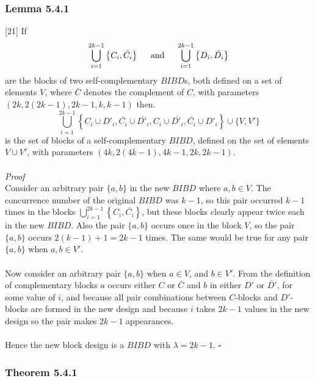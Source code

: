 \documentclass[
  12pt,
  a4paper]{book}
\begin{document}
\hypertarget{lemma-5.4.1}{%
\subsubsection{Lemma 5.4.1}\label{lemma-5.4.1}}

{[}21{]} If
\[\bigcup\limits_{i=1}^{2k-1} \left \{C_i,\bar{C_i} \right \} \hspace{0.5cm} \mathrm{and} \hspace{0.5cm} 
\bigcup\limits_{i=1}^{2k-1} \left \{D_i,\bar{D_i} \right \}\] are the
blocks of two self-complementary \(BIBD\)s, both defined on a set of
elements \(V\), where \(\bar{C}\) denotes the complement of \(C\), with
parameters \((2k,2(2k-1),2k-1,k,k-1)\) then.
\[\bigcup\limits_{i=1}^{2k-1} \left \{C_i \cup D'_i, \bar{C_i} \cup \bar{D'_i}, C_i \cup \bar{D'_i},
\bar{C_i} \cup D'_i  \right \} \cup \{V,V'\}\] is the set of blocks of a
self-complementary \(BIBD\), defined on the set of elements
\(V \cup V'\), with parameters \((4k,2(4k-1),4k-1,2k,2k-1)\).\\
~\\
\emph{Proof}\\
Consider an arbitrary pair \(\{a,b\}\) in the new \(BIBD\) where
\(a,b \in V\). The concurrence number of the original \(BIBD\) was
\(k-1\), so this pair occurred \(k-1\) times in the blocks
\(\bigcup\limits_{i=1}^{2k-1} \left \{C_i,\bar{C_i} \right \}\), but
these blocks clearly appear twice each in the new \(BIBD\). Also the
pair \(\{a,b\}\) occurs once in the block \(V\), so the pair \(\{a,b\}\)
occurs \(2(k-1)+1 = 2k-1\) times. The same would be true for any pair
\(\{a,b\}\) when \(a,b \in V'\).\\
~\\
Now consider an arbitrary pair \(\{a,b\}\) when \(a \in V\), and
\(b \in V'\). From the definition of complementary blocks \(a\) occurs
either \(C\) or \(\bar{C}\) and \(b\) in either \(D'\) or \(\bar{D'}\),
for some value of \(i\), and because all pair combinations between
\(C\)-blocks and \(D'\)-blocks are formed in the new design and because
\(i\) takes \(2k-1\) values in the new design so the pair makes \(2k-1\)
appearances.\\
~\\
Hence the new block design is a \(BIBD\) with \(\lambda =2k-1\).
\(\square\)

\hypertarget{theorem-5.4.1}{%
\subsubsection{Theorem 5.4.1}\label{theorem-5.4.1}}
\end{document}
